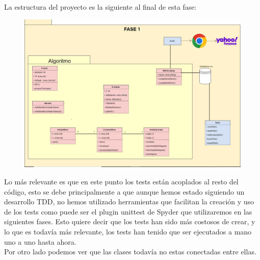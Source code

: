 \documentclass[12pt,a4paper]{article}
\begin{document}
	La estructura del proyecto es la siguiente al final de esta fase:\\
\begin{figure}[H]
\centering
  \centering
  \includegraphics[width=1\linewidth]{Fase 1}
\label{fig:subrgrafo}
\end{figure}
	Lo más relevante es que en este punto los tests están acoplados al resto del código, esto se debe principalmente a que aunque hemos estado siguiendo un desarrollo TDD, no hemos utilizado herramientas que facilitan la creación y uso de los tests como puede ser el plugin unittest de Spyder que utilizaremos en las siguientes fases. Esto quiere decir que los tests han sido más costosos de crear, y lo que es todavía más relevante, los tests han tenido que ser ejecutados a mano uno a uno hasta ahora.\\ 
	Por otro lado podemos ver que las clases todavía no estas conectadas entre ellas.\\
\end{document}
